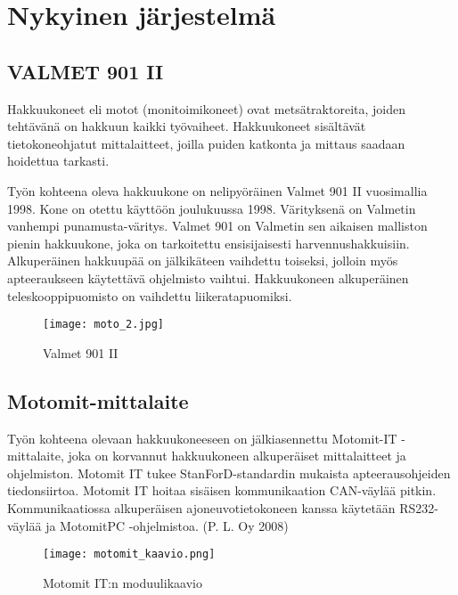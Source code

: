 \newpage

\chapter{Nykyinen järjestelmä}

\section{VALMET 901 II}

Hakkuukoneet eli motot (monitoimikoneet) ovat metsätraktoreita, joiden tehtävänä on hakkuun kaikki työvaiheet. Hakkuukoneet sisältävät tietokoneohjatut mittalaitteet, joilla puiden katkonta ja mittaus saadaan hoidettua tarkasti.

Työn kohteena oleva hakkuukone on nelipyöräinen Valmet 901 II vuosimallia 1998. Kone on otettu käyttöön joulukuussa 1998. Värityksenä on Valmetin vanhempi punamusta-väritys. Valmet 901 on Valmetin sen aikaisen malliston pienin hakkuukone, joka on tarkoitettu ensisijaisesti harvennushakkuisiin. Alkuperäinen hakkuupää on jälkikäteen vaihdettu toiseksi, jolloin myös apteeraukseen käytettävä ohjelmisto vaihtui. Hakkuukoneen alkuperäinen teleskooppipuomisto on vaihdettu liikeratapuomiksi.
\newline

\begin{figure}[H]
\centering
\texttt{[image: moto\_2.jpg]}
\caption{Valmet 901 II}
\end{figure}

\section{Motomit-mittalaite}

Työn kohteena olevaan hakkuukoneeseen on jälkiasennettu Motomit-IT
-mittalaite, joka on korvannut hakkuukoneen alkuperäiset mittalaitteet
ja ohjelmiston. Motomit IT tukee StanForD-standardin mukaista
apteerausohjeiden tiedonsiirtoa. Motomit IT hoitaa sisäisen
kommunikaation CAN-väylää pitkin. Kommunikaatiossa alkuperäisen
ajoneuvotietokoneen kanssa käytetään RS232-väylää ja MotomitPC
-ohjelmistoa. (P. L. Oy 2008)
\newline

\begin{figure}[H]
\centering
\texttt{[image: motomit\_kaavio.png]}
\caption{Motomit IT:n moduulikaavio}
\end{figure}
\newpage

